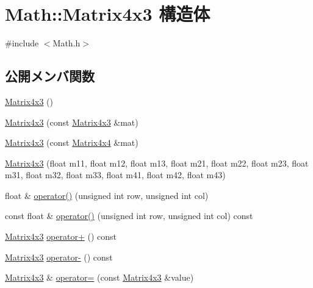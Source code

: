 \hypertarget{struct_math_1_1_matrix4x3}{}\section{Math\+:\+:Matrix4x3 構造体}
\label{struct_math_1_1_matrix4x3}


{\ttfamily \#include $<$Math.\+h$>$}

\subsection*{公開メンバ関数}
\begin{DoxyCompactItemize}
\item 
\mbox{\hyperlink{struct_math_1_1_matrix4x3_a19639372b71d4a34a68b59fb55d01e8f}{Matrix4x3}} ()
\item 
\mbox{\hyperlink{struct_math_1_1_matrix4x3_a8c6caa8ec7d8be40c2316f922de72cc3}{Matrix4x3}} (const \mbox{\hyperlink{struct_math_1_1_matrix4x3}{Matrix4x3}} \&mat)
\item 
\mbox{\hyperlink{struct_math_1_1_matrix4x3_a7036833e9643c5ffa558823fdb9c1ae8}{Matrix4x3}} (const \mbox{\hyperlink{struct_math_1_1_matrix4x4}{Matrix4x4}} \&mat)
\item 
\mbox{\hyperlink{struct_math_1_1_matrix4x3_a5f512b36c9628431fda0dc0c1c4946c0}{Matrix4x3}} (float m11, float m12, float m13, float m21, float m22, float m23, float m31, float m32, float m33, float m41, float m42, float m43)
\item 
float \& \mbox{\hyperlink{struct_math_1_1_matrix4x3_ac8d1782be2c7f26865d64d14526a2e40}{operator()}} (unsigned int row, unsigned int col)
\item 
const float \& \mbox{\hyperlink{struct_math_1_1_matrix4x3_a183465e227b61615c91cf797fade0100}{operator()}} (unsigned int row, unsigned int col) const
\item 
\mbox{\hyperlink{struct_math_1_1_matrix4x3}{Matrix4x3}} \mbox{\hyperlink{struct_math_1_1_matrix4x3_af15226cd8a563832c7be454e3c3dbd66}{operator+}} () const
\item 
\mbox{\hyperlink{struct_math_1_1_matrix4x3}{Matrix4x3}} \mbox{\hyperlink{struct_math_1_1_matrix4x3_af2d9a6fc59e55d9f6614a73bc2a8d9c3}{operator-\/}} () const
\item 
\mbox{\hyperlink{struct_math_1_1_matrix4x3}{Matrix4x3}} \& \mbox{\hyperlink{struct_math_1_1_matrix4x3_a0acdbec3dd5238f4b9c1ce03b3555499}{operator=}} (const \mbox{\hyperlink{struct_math_1_1_matrix4x3}{Matrix4x3}} \&value)
\item 

\end{DoxyCompactItemize}
